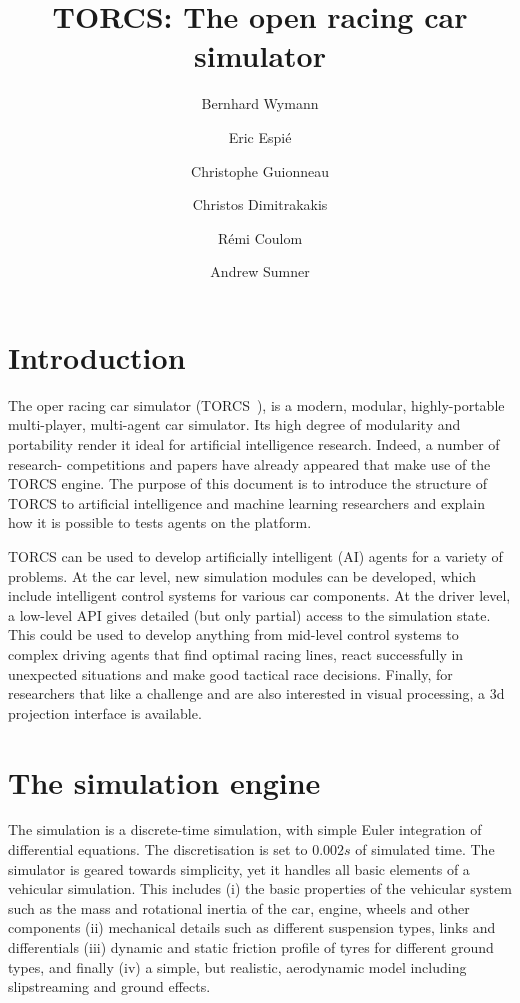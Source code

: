 \documentclass[a4paper]{article}
\title{TORCS: The open racing car simulator}
\author{Bernhard Wymann \and Eric Espi\'e \and Christophe Guionneau \and Christos Dimitrakakis \and R\'emi Coulom \and Andrew Sumner}
\begin{document}
\maketitle

\section{Introduction}

The oper racing car simulator (TORCS~\cite{TORCS}), is a modern, modular, highly-portable multi-player, multi-agent car simulator. Its high degree of modularity and portability render it ideal for artificial intelligence research. Indeed, a number of research- competitions and papers have already appeared that make use of the TORCS engine. The purpose of this document is to introduce the structure of TORCS to artificial intelligence and machine learning researchers and explain how it is possible to tests agents on the platform.

TORCS can be used to develop artificially intelligent (AI) agents for a variety of problems. At the car level, new simulation modules can be developed, which include intelligent control systems for various car components. At the driver level, a low-level API gives detailed (but only partial) access to the simulation state. This could be used to develop anything from mid-level control systems to complex driving agents that find optimal racing lines, react successfully in unexpected situations and make good tactical race decisions. Finally, for researchers that like a challenge and are also interested in visual processing, a 3d projection interface is available.

\section{The simulation engine}

The simulation is a discrete-time simulation, with simple Euler integration of differential equations. The discretisation is set to $0.002s$ of simulated time. The simulator is geared towards simplicity, yet it handles all basic elements of a vehicular simulation.
This includes (i) the basic properties of the vehicular system such as the mass and rotational inertia of the car, engine, wheels and other components  (ii) mechanical details such as different suspension types, links and differentials (iii) dynamic and static friction profile of tyres for different ground types, and finally (iv) a simple, but realistic, aerodynamic model including slipstreaming and ground effects.
\end{document}
